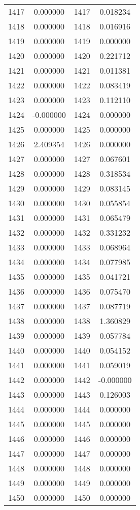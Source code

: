 \documentclass[12pt]{article}
\begin{document}
\begin{longtable}{@{}cccc@{}}
1417 & 0.000000 & 1417 & 0.018234 \\
1418 & 0.000000 & 1418 & 0.016916 \\
1419 & 0.000000 & 1419 & 0.000000 \\
1420 & 0.000000 & 1420 & 0.221712 \\
1421 & 0.000000 & 1421 & 0.011381 \\
1422 & 0.000000 & 1422 & 0.083419 \\
1423 & 0.000000 & 1423 & 0.112110 \\
1424 & -0.000000 & 1424 & 0.000000 \\
1425 & 0.000000 & 1425 & 0.000000 \\
1426 & 2.409354 & 1426 & 0.000000 \\
1427 & 0.000000 & 1427 & 0.067601 \\
1428 & 0.000000 & 1428 & 0.318534 \\
1429 & 0.000000 & 1429 & 0.083145 \\
1430 & 0.000000 & 1430 & 0.055854 \\
1431 & 0.000000 & 1431 & 0.065479 \\
1432 & 0.000000 & 1432 & 0.331232 \\
1433 & 0.000000 & 1433 & 0.068964 \\
1434 & 0.000000 & 1434 & 0.077985 \\
1435 & 0.000000 & 1435 & 0.041721 \\
1436 & 0.000000 & 1436 & 0.075470 \\
1437 & 0.000000 & 1437 & 0.087719 \\
1438 & 0.000000 & 1438 & 1.360829 \\
1439 & 0.000000 & 1439 & 0.057784 \\
1440 & 0.000000 & 1440 & 0.054152 \\
1441 & 0.000000 & 1441 & 0.059019 \\
1442 & 0.000000 & 1442 & -0.000000 \\
1443 & 0.000000 & 1443 & 0.126003 \\
1444 & 0.000000 & 1444 & 0.000000 \\
1445 & 0.000000 & 1445 & 0.000000 \\
1446 & 0.000000 & 1446 & 0.000000 \\
1447 & 0.000000 & 1447 & 0.000000 \\
1448 & 0.000000 & 1448 & 0.000000 \\
1449 & 0.000000 & 1449 & 0.000000 \\
1450 & 0.000000 & 1450 & 0.000000 \\

\end{longtable}
\end{document}

